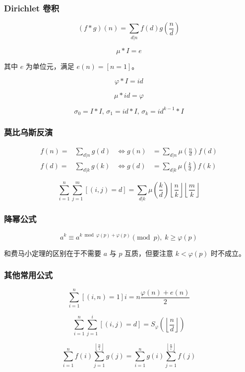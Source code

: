 \subsubsection[狄利克雷（Dirichlet）卷积]{Dirichlet 卷积}
	$$ (f * g)(n) = \sum_{d | n} f(d) g\left( \frac n d \right) $$
	
	$$\mu * I = e$$

	其中 $e$ 为单位元，满足 $e(n) = [n = 1]$。

	$$\varphi * I = id $$

	$$\mu * id = \varphi $$

	$$\sigma_0 = I * I ,\, \sigma_1 = id * I ,\, \sigma_k = id^{k - 1} * I$$

\subsubsection{莫比乌斯反演}
	$$ \begin{aligned}
		f(n) = & \sum_{d | n} g(d) & \Leftrightarrow g(n) & = \sum_{d | n} \mu\left( \frac n d \right) f(d) \\
		f(d) = & \sum_{d | k} g(k) & \Leftrightarrow g(d) & = \sum_{d | k} \mu\left( \frac k d \right) f(k)
	\end{aligned} $$

	$$\sum_{i = 1} ^ n \sum_{j = 1} ^ m \left[(i, j) = d\right] = \sum_{d | k} \mu\left( \frac k d \right) \left\lfloor \frac n k \right\rfloor \left\lfloor \frac m k \right\rfloor$$

\subsubsection{降幂公式}

$$ a^k \equiv a ^ {k \bmod \varphi(p) + \varphi(p)} \pmod p,\; k \ge \varphi(p) $$

和费马小定理的区别在于不需要 $a$ 与 $p$ 互质，但要注意 $k < \varphi(p)$ 时不成立。

\subsubsection{其他常用公式}

	$$\sum_{i = 1} ^ n \left[(i, n) = 1\right] i = n \frac {\varphi(n) + e(n)} 2$$
	
	$$\sum_{i = 1} ^ n \sum_{j = 1} ^ i \left[(i, j) = d\right] = S_\varphi \left( \left\lfloor \frac n d \right\rfloor \right)$$

	$$ \sum_{i = 1} ^ n f(i) \sum_{j = 1} ^ {\left\lfloor \frac n i \right\rfloor} g(j) = \sum_{i = 1} ^ n g(i) \sum_{j = 1} ^ {\left\lfloor \frac n i \right\rfloor} f(j) $$
